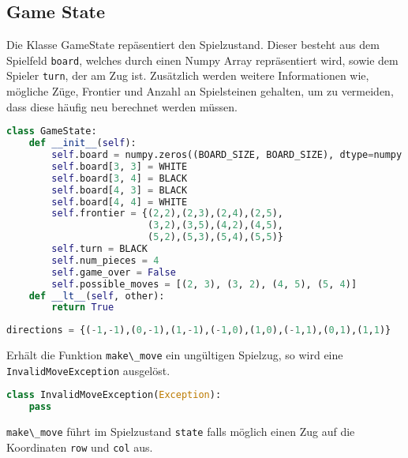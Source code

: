\hypertarget{game-state}{%
\subsection{Game State}\label{game-state}}

Die Klasse GameState repäsentiert den Spielzustand. Dieser besteht aus
dem Spielfeld \passthrough{\lstinline!board!}, welches durch einen Numpy
Array repräsentiert wird, sowie dem Spieler
\passthrough{\lstinline!turn!}, der am Zug ist. Zusätzlich werden
weitere Informationen wie, mögliche Züge, Frontier und Anzahl an
Spielsteinen gehalten, um zu vermeiden, dass diese häufig neu berechnet
werden müssen.

\begin{lstlisting}[language=Python]
class GameState:
    def __init__(self):
        self.board = numpy.zeros((BOARD_SIZE, BOARD_SIZE), dtype=numpy.int8)
        self.board[3, 3] = WHITE
        self.board[3, 4] = BLACK
        self.board[4, 3] = BLACK
        self.board[4, 4] = WHITE
        self.frontier = {(2,2),(2,3),(2,4),(2,5),
                         (3,2),(3,5),(4,2),(4,5),
                         (5,2),(5,3),(5,4),(5,5)}
        self.turn = BLACK
        self.num_pieces = 4
        self.game_over = False
        self.possible_moves = [(2, 3), (3, 2), (4, 5), (5, 4)]
    def __lt__(self, other):
        return True
\end{lstlisting}

\begin{lstlisting}[language=Python]
directions = {(-1,-1),(0,-1),(1,-1),(-1,0),(1,0),(-1,1),(0,1),(1,1)}
\end{lstlisting}

Erhält die Funktion \passthrough{\lstinline!make\_move!} ein ungültigen
Spielzug, so wird eine \passthrough{\lstinline!InvalidMoveException!}
ausgelöst.

\begin{lstlisting}[language=Python]
class InvalidMoveException(Exception):
    pass
\end{lstlisting}

\passthrough{\lstinline!make\_move!} führt im Spielzustand
\passthrough{\lstinline!state!} falls möglich einen Zug auf die
Koordinaten \passthrough{\lstinline!row!} und
\passthrough{\lstinline!col!} aus.

